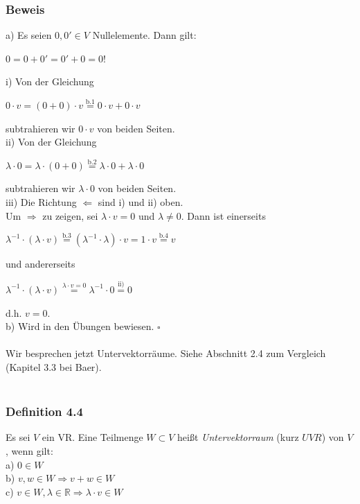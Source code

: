 \documentclass{article}
\begin{document}
\subsubsection*{Beweis}
a) 
Es seien $0,0' \in V$ Nullelemente. Dann gilt: \\
\begin{center}
    $0 = 0 + 0' = 0' + 0 = 0!$ \\
\end{center}
i) 
Von der Gleichung \\
\begin{center}
    $0 \cdot v = (0+0) \cdot v \overset{\text{b.1}}{=} 0 \cdot v + 0 \cdot v$ \\
\end{center}
subtrahieren wir $0 \cdot v$ von beiden Seiten. \\
ii) 
Von der Gleichung \\
\begin{center}
    $\lambda \cdot 0 = \lambda \cdot (0+0) \overset{\text{b.2}}{=} \lambda \cdot 0 + \lambda \cdot 0$ \\
\end{center}
subtrahieren wir $\lambda \cdot 0$ von beiden Seiten. \\
iii) 
Die Richtung $\Leftarrow$ sind i) und ii) oben. \\
Um $\Rightarrow$ zu zeigen, sei $\lambda \cdot v = 0$ und $\lambda \neq 0$. Dann ist einerseits \\
\begin{center}
    $\lambda^{-1} \cdot (\lambda \cdot v) \overset{\text{b.3}}{=} (\lambda^{-1} \cdot \lambda) \cdot v = 1 \cdot v \overset{\text{b.4}}{=} v$ \\
\end{center}
und andererseits \\
\begin{center}
    $\lambda^{-1} \cdot (\lambda \cdot v) \overset{\lambda \cdot v = 0}{=} \lambda^{-1} \cdot 0 \overset{\text{ii)}}{=} 0$ \\
\end{center}
d.h. $v = 0$. \\
b) 
Wird in den Übungen bewiesen. $\square$ \\
\\
Wir besprechen jetzt Untervektorräume. Siehe Abschnitt 2.4 zum Vergleich (Kapitel 3.3 bei Baer). \\
\\
\subsubsection*{Definition 4.4}
Es sei $V$ ein VR. Eine Teilmenge $W \subset V$ heißt \textit{Untervektorraum} (kurz $\textit{UVR}$) von $V$, wenn gilt: \\
a) $0 \in W$ \\
b) $v,w \in W \Rightarrow v+w \in W$ \\
c) $v \in W, \lambda \in \mathbb{R} \Rightarrow \lambda \cdot v \in W$ \\
\\
\end{document}
